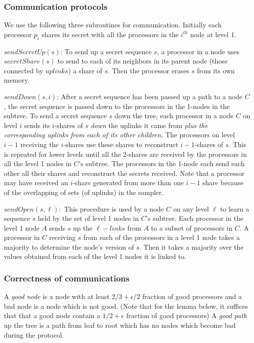 \documentclass{sig-alternate}
\begin{document}
\subsubsection{Communication protocols}


We use the following three subroutines for communication.  Initially each processor $p_i$ shares its secret with all the processors in the $i^{th}$ node at level 1.
 
\smallskip
\noindent
$sendSecretUp(s)$: To  send up a secret sequence $s$, a  processor in a node uses $secretShare(s )$  to  send to each of its neighbors in its parent node (those connected by $uplinks$) a share of $s$.  Then the processor erases $s$ from its own memory.

\smallskip
\noindent
$sendDown(s,i)$: After a secret sequence has been passed up a path to a node $C$, the secret sequence is passed down to  the processors in the 1-nodes in the subtree.  To send a secret sequence $s$ down the tree, each processor in a node $C$ on level $i$ sends its $i$-shares of  $s$ {\it down} the uplinks it came from {\it plus the  corresponding uplinks from each of its other children}.  The processors  on level $i-1$ receiving the $i$-shares use these shares to reconstruct  $i-1$-shares of $s$. This is repeated for lower levels until  all the 2-shares are received by the processors in all the level 1 nodes in  $C$'s subtree. The processors in the 1-node  each send each other all their shares and reconstruct the secrets received. Note that a processor may have received an $i$-share generated from more than one $i-1$ share because of the overlapping of sets  (of uplinks) in the sampler.

\smallskip
\noindent
$sendOpen(s, \ell ):$ This procedure is used by a node $C$ on any level $\ell$  to learn a sequence $s$ held by the set of level 1 nodes in $C$'s subtree.  Each processor in the level 1 node  $A$ sends $s$ up the $\ell-links$ from $A$ to a subset of processors in $C$. 
 A processor in $C$ receiving $s$ from each of the processors in a level 1 node takes a majority to determine the node's  version of  $s$.
Then it takes a majority over  the values obtained from each of the level 1 nodes it is linked to.  

\subsubsection{Correctness of communications}\label{s:correct-comm}

\begin{definition} A {\it good node} is a node with at least $2/3 +\epsilon/2$ fraction of good processors and a bad node is a node which is not good.
(Note that for the lemma below, it suffices that that a good node contain a $1/2+ \epsilon$ fraction of good processors)
A {\it good path} up the tree is a path from leaf to root which has no nodes which become bad during the protocol. 
\end{definition}
\end{document}
